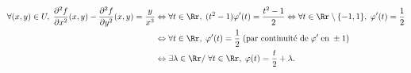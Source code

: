 {{\begin{align*}\ensuremath
\forall(x,y)\in U,\;\frac{\partial^2f}{\partial x^2}(x,y)-\frac{\partial^2f}{\partial y^2}(x,y)=\frac{y}{x^3}&\Leftrightarrow\forall t\in\Rr,\;(t^2-1)\varphi'(t)=\frac{t^2-1}{2}\Leftrightarrow\forall t\in\Rr\setminus\{-1,1\},\;\varphi'(t)=\frac{1}{2}\\
 &\Leftrightarrow\forall t\in\Rr,\;\varphi'(t)=\frac{1}{2}\;(\text{par continuité de}\;\varphi'\;\text{en}\;\pm1)\\
 &\Leftrightarrow\exists\lambda\in\Rr/\;\forall t\in\Rr,\;\varphi(t)=\frac{t}{2}+\lambda.
\end{align*}
}
}
